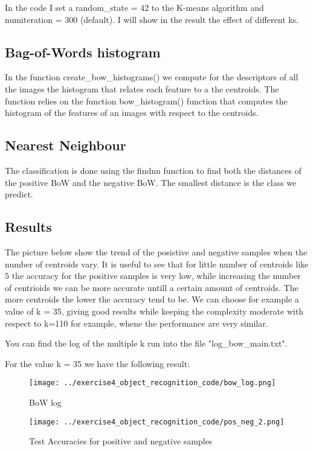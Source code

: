 \documentclass{ETHExercise}
\begin{document}
In the code I set a random\_state = 42 to the K-means algorithm and numiteration = 300 (default). I will show in the result the effect of different ks.

\subsection{Bag-of-Words histogram}
In the function create\_bow\_histograms() we compute for the descriptors of all the images 
the histogram that relates each feature to a the centroids. The function
relies on the function bow\_histogram() function that computes the histogram of the features of an images
with respect to the centroids.

\subsection{Nearest Neighbour}

The classification is done using the findnn function to find both the 
distances of the positive BoW and the negative BoW. The smallest distance
is the class we predict.

\subsection{Results}
The picture below show the trend of the posistive and negative samples when the number
of centroids vary. It is useful to see that for little number of centroids like 5 the accuracy for the positive 
samples is very low, while increasing the number of centrioids we can be more accurate untill a certain amount of centroids. 
The more centroids the lower the accuracy tend to be. We can choose for example a value of k = 35, giving
good results while keeping the complexity moderate with respect to k=110 for example, whene the performance are very similar.

You can find the log of the multiple k run into the file "log\_bow\_main.txt".

For the value k = 35 we have the following result:

\begin{figure}[!h]
  \centering
  \texttt{[image: ../exercise4\_object\_recognition\_code/bow\_log.png]}
  \caption{BoW log}
\end{figure}


\begin{figure}[!h]
  \centering
  \texttt{[image: ../exercise4\_object\_recognition\_code/pos\_neg\_2.png]}
  \caption{Test Accuracies for positive and negative samples}
\end{figure}
\end{document}
